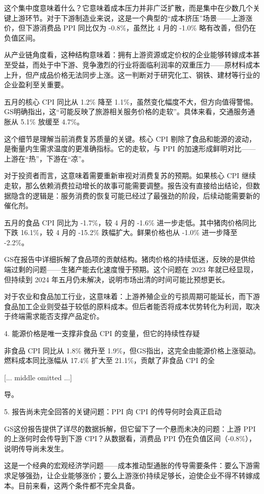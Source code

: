 \documentclass[11pt]{ctexart}
\begin{document}
这个集中度意味着什么？它意味着成本压力并非广泛扩散，而是集中在少数几个关键上游环节。对于下游制造业来说，这是一个典型的“成本挤压”场景——上游涨价，但下游消费品 PPI 同比仅为 -0.8\%，虽然比 4 月的 -1.0\% 略有改善，但仍在负值区间。

从产业链角度看，这种结构意味着：拥有上游资源或定价权的企业能够转嫁成本甚至受益，而处于中下游、竞争激烈的行业将面临利润率的双重压力——原材料成本上升，但产成品价格无法同步上涨。这一判断对于研究化工、钢铁、建材等行业的企业盈利至关重要。

五月的核心 CPI 同比从 1.2\% 降至 1.1\%，虽然变化幅度不大，但方向值得警惕。GS明确指出，这“可能反映了旅游相关服务价格的走软”。具体来看，交通服务通胀从 5.1\% 放缓至 4.7\%。

这个细节是理解当前消费复苏质量的关键。核心 CPI 剔除了食品和能源的波动，是衡量内生需求温度的更准确指标。它的走软，与 PPI 的加速形成鲜明对比——上游在“热”，下游在“凉”。

对于投资者而言，这意味着需要重新审视对消费复苏的预期。如果核心 CPI 继续走软，那么依赖消费拉动增长的故事可能需要调整。报告没有直接给出结论，但数据隐含的逻辑是：服务消费的恢复可能已经过了最强劲的阶段，后续动能需要新的催化剂。

五月的食品 CPI 同比为 -1.7\%，较 4 月的 -1.6\% 进一步走低。其中猪肉价格同比下跌 16.1\%，较 4 月的 -15.2\% 跌幅扩大。鲜果价格也从 -1.0\% 进一步降至 -2.2\%。

GS在报告中详细拆解了食品项的贡献结构。猪肉价格的持续低迷，反映的是供给端过剩的问题——生猪产能去化速度慢于预期。这个问题在 2023 年就已经显现，但持续到 2024 年五月仍未解决，说明市场出清的时间可能比预想更长。

对于农业和食品加工行业，这意味着：上游养殖企业的亏损周期可能延长，而下游食品加工企业则受益于较低的原料成本。但后者能否将成本优势转化为利润，取决于终端需求能否支撑产品定价。

4. 能源价格是唯一支撑非食品 CPI 的变量，但它的持续性存疑

非食品 CPI 同比从 1.8\% 微升至 1.9\%，但GS指出，这完全由能源价格上涨驱动。燃料成本同比涨幅从 17.4\% 扩大至 21.1\%，贡献了非食品 CPI 的全

[... middle omitted ...]

导。

5. 报告尚未完全回答的关键问题：PPI 向 CPI 的传导何时会真正启动

GS这份报告提供了详尽的数据拆解，但它留下了一个悬而未决的问题：上游 PPI 的上涨何时会传导到下游 CPI？从数据看，消费品 PPI 仍在负值区间（-0.8\%），说明传导尚未发生。

这是一个经典的宏观经济学问题——成本推动型通胀的传导需要条件：要么下游需求足够强劲，让企业能够涨价；要么上游涨价持续足够长，迫使企业不得不转嫁成本。目前来看，这两个条件都不完全具备。
\end{document}
